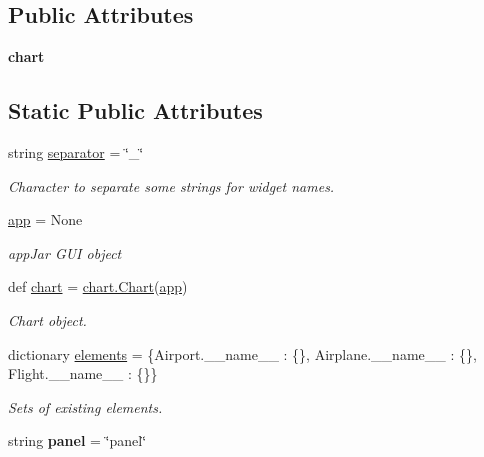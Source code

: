 \subsection*{Public Attributes}
\begin{DoxyCompactItemize}
\item 
{\bfseries chart}
\end{DoxyCompactItemize}
\subsection*{Static Public Attributes}
\begin{DoxyCompactItemize}
\item 
\mbox{\label{classapp_1_1_app_ad2939f11328b40309ceb610afff7cada}} 
string \hyperlink{classapp_1_1_app_ad2939f11328b40309ceb610afff7cada}{separator} = \char`\"{}\+\_\+\char`\"{}
\begin{DoxyCompactList}\small\item\em Character to separate some strings for widget names. \end{DoxyCompactList}\item 
\hyperlink{group___g_u_i_ga7e1b425e21cce7dcb596d72fad3c3282}{app} = None
\begin{DoxyCompactList}\small\item\em app\+Jar G\+UI object \end{DoxyCompactList}\item 
\mbox{\label{classapp_1_1_app_a9de028570fbb7ebc55c4e60f90bd1a38}} 
def \hyperlink{classapp_1_1_app_a9de028570fbb7ebc55c4e60f90bd1a38}{chart} = \hyperlink{classchart_1_1_chart}{chart.\+Chart}(\hyperlink{group___g_u_i_ga7e1b425e21cce7dcb596d72fad3c3282}{app})
\begin{DoxyCompactList}\small\item\em Chart object. \end{DoxyCompactList}\item 
dictionary \hyperlink{classapp_1_1_app_a34fc4a7d78896ff3d20612ee6bb9e169}{elements} = \{Airport.\+\_\+\+\_\+name\+\_\+\+\_\+ \+: \{\}, Airplane.\+\_\+\+\_\+name\+\_\+\+\_\+ \+: \{\}, Flight.\+\_\+\+\_\+name\+\_\+\+\_\+ \+: \{\}\}
\begin{DoxyCompactList}\small\item\em Sets of existing elements. \end{DoxyCompactList}\item 
string {\bfseries panel} = \char`\"{}panel\char`\"{}

\end{DoxyCompactItemize}
